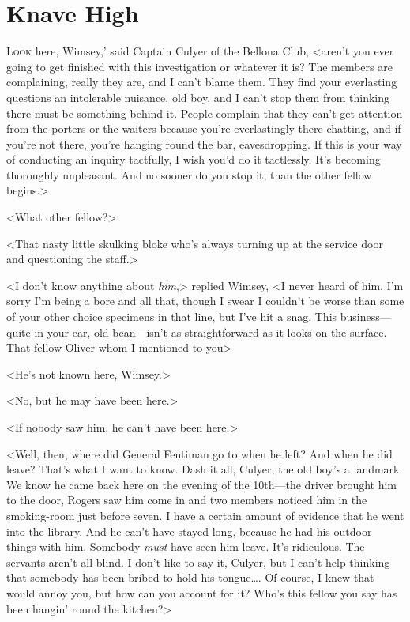 \chapter{Knave High}

\lettrine[ante=‘]{L}{ook} here, Wimsey,' said Captain Culyer of the Bellona Club, <aren't you ever going to get finished with this investigation or whatever it is? The members are complaining, really they are, and I can't blame them. They find your everlasting questions an intolerable nuisance, old boy, and I can't stop them from thinking there must be something behind it. People complain that they can't get attention from the porters or the waiters because you're everlastingly there chatting, and if you're not there, you're hanging round the bar, eavesdropping. If this is your way of conducting an inquiry tactfully, I wish you'd do it tactlessly. It's becoming thoroughly unpleasant. And no sooner do you stop it, than the other fellow begins.>

<What other fellow?>

<That nasty little skulking bloke who's always turning up at the service door and questioning the staff.>

<I don't know anything about \emph{him},> replied Wimsey, <I never heard of him. I'm sorry I'm being a bore and all that, though I swear I couldn't be worse than some of your other choice specimens in that line, but I've hit a snag. This business—quite in your ear, old bean—isn't as straightforward as it looks on the surface. That fellow Oliver whom I mentioned to you\longdash>

<He's not known here, Wimsey.>

<No, but he may have been here.>

<If nobody saw him, he can't have been here.>

<Well, then, where did General Fentiman go to when he left? And when he did leave? That's what I want to know. Dash it all, Culyer, the old boy's a landmark. We know he came back here on the evening of the 10th—the driver brought him to the door, Rogers saw him come in and two members noticed him in the smoking-room just before seven. I have a certain amount of evidence that he went into the library. And he can't have stayed long, because he had his outdoor things with him. Somebody \emph{must} have seen him leave. It's ridiculous. The servants aren't all blind. I don't like to say it, Culyer, but I can't help thinking that somebody has been bribed to hold his tongue\dots. Of course, I knew that would annoy you, but how can you account for it? Who's this fellow you say has been hangin' round the kitchen?>

